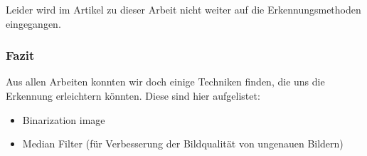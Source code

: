 Leider wird im Artikel zu dieser Arbeit nicht weiter auf die Erkennungsmethoden eingegangen.

\subsubsection{Fazit}
Aus allen Arbeiten konnten wir doch einige Techniken finden, die uns die Erkennung erleichtern könnten. Diese sind hier aufgelistet:
\begin{itemize}
	\item Binarization image 
	\item Median Filter (für Verbesserung der Bildqualität von ungenauen Bildern)
\end{itemize}
